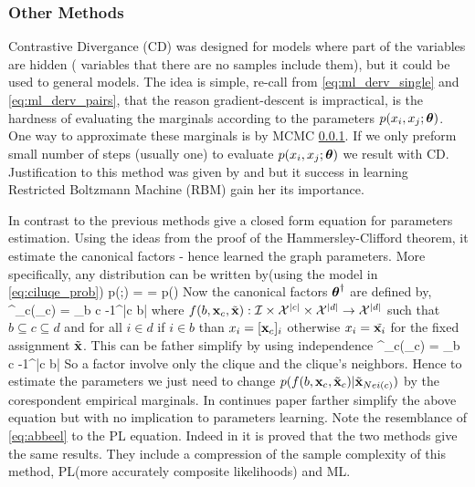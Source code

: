 \subsubsection{Other Methods}
Contrastive Divergance (CD) \cite{hinton2002training}  was designed for models where part of the variables are hidden ( variables that there are no samples include them), but it could be used to general models.
The idea is simple, re-call from \eqref{eq:ml_derv_single} and \eqref{eq:ml_derv_pairs}, that the reason gradient-descent is impractical,  is  the hardness of evaluating the marginals according to the parameters $p(x_i,x_j;\boldsymbol{\theta})$. 
One way to approximate these marginals  is by MCMC \ref{}.
If we only preform small number of steps (usually one) to evaluate $p(x_i,x_j;\boldsymbol{\theta})$ we result with CD.
Justification to this method was given by \cite{bengio2009justifying} and \cite{carreira2005contrastive} but it success in learning Restricted Boltzmann Machine (RBM) gain her its importance.

In contrast to the previous methods   \cite{abbeel2006learning} give a closed form equation for parameters estimation.
Using the ideas from the proof of the Hammersley-Clifford theorem,  it estimate the canonical factors  - hence learned the graph parameters.
More specifically, any distribution can be written by(using the model in \eqref{eq:ciluqe_prob}) 
\be
p(\xx;\exact{\thetav}) =   = p(\tilde{\xx})
\ee
Now the canonical factors $\boldsymbol{\theta}^{\dagger}$ are defined by,
\be
\thetav^{\dagger}_{c}(\xx_c) = \sum_{b \subseteq c} -1^{|c \setminus b|} 
\ee
where  $f(b,{\bf x}_c,\tilde{{\bf x}}) : {\cal I} \times {\cal X}^{|c|} \times {\cal X}^{|d|}\to {\cal X}^{|d|}$  such that $b \subseteq c\subseteq d$ and for all $i \in d$ if $i \in b$ than $x_i = [{\bf x}_c]_i$ otherwise $x_i = \tilde{{\bf x}_i}$ for the fixed assignment $\tilde{{\bf x}}$.
This can be father simplify by using independence 
\be
\label{eq:abbeel}
\thetav^{\dagger}_{c}(\xx_c) = \sum_{b \subseteq c} -1^{|c \setminus b|} 
\ee
So a factor involve only the clique and the clique's neighbors.
Hence to estimate the parameters we just need to change $p(f(b,{\bf x}_c,\tilde{{\bf x}}_c) |\tilde{{\bf x}}_{Nei(c)})$ by the corespondent empirical marginals.
In continues  paper \cite{roy2009learning} farther simplify the above equation but with no  implication to parameters learning.
Note the resemblance of  \eqref{eq:abbeel} to the PL equation.
Indeed in \cite{bradley2012sample} it is proved that the two methods give the same results.
They include a compression of the sample complexity of this method, PL(more accurately composite likelihoods)  and ML.

